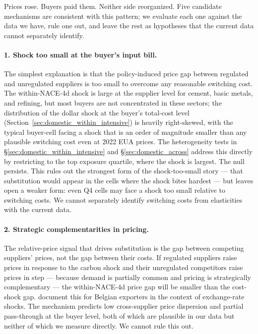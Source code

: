 
Prices rose. Buyers paid them. Neither side reorganized. Five candidate mechanisms are consistent with this pattern; we evaluate each one against the data we have, rule one out, and leave the rest as hypotheses that the current data cannot separately identify.

\paragraph{1. Shock too small at the buyer's input bill.} The simplest explanation is that the policy-induced price gap between regulated and unregulated suppliers is too small to overcome any reasonable switching cost. The within-NACE-4d shock is large at the supplier level for cement, basic metals, and refining, but most buyers are not concentrated in these sectors; the distribution of the dollar shock at the buyer's total-cost level (Section~\ref{sec:domestic_within_intensive}) is heavily right-skewed, with the typical buyer-cell facing a shock that is an order of magnitude smaller than any plausible switching cost even at 2022 EUA prices. The heterogeneity tests in \S\ref{sec:domestic_within_intensive} and \S\ref{sec:domestic_across} address this directly by restricting to the top exposure quartile, where the shock is largest. The null persists. This rules out the strongest form of the shock-too-small story --- that substitution would appear in the cells where the shock bites hardest --- but leaves open a weaker form: even Q4 cells may face a shock too small relative to switching costs. We cannot separately identify switching costs from elasticities with the current data.

\paragraph{2. Strategic complementarities in pricing.} The relative-price signal that drives substitution is the gap between competing suppliers' prices, not the gap between their costs. If regulated suppliers raise prices in response to the carbon shock and their unregulated competitors raise prices in step --- because demand is partially common and pricing is strategically complementary --- the within-NACE-4d price gap will be smaller than the cost-shock gap. \citet{amitiitskhokionings2014} document this for Belgian exporters in the context of exchange-rate shocks. The mechanism predicts low cross-supplier price dispersion and partial pass-through at the buyer level, both of which are plausible in our data but neither of which we measure directly. We cannot rule this out.

